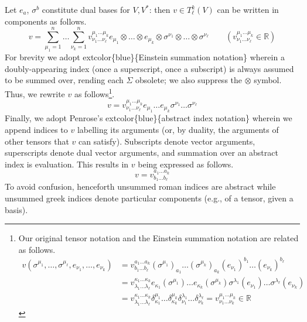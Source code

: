 \documentclass[
]{book}
\begin{document}
Let \(e_a\), \(\sigma^b\) constitute dual bases for \(V, V^*\): then \(v \in T^k_\ell(V)\) can be written in components as follows.
\begin{equation} 
    v = \sum_{\mu_1 = 1}^n \dots \sum_{\nu_k = 1}^n v^{\mu_1\dots \mu_k}_{\nu_1\dots \nu_\ell} e_{\mu_1} \otimes \dots \otimes e_{\mu_k} \otimes \sigma^{\nu_1} \otimes \dots \otimes \sigma^{\nu_\ell} \qquad (v^{\mu_1\dots \mu_k}_{\nu_1\dots \nu_\ell} \in \mathbb{R}) 
\end{equation}
For brevity we adopt extcolor\{blue\}\{Einstein summation notation\} wherein a doubly-appearing index (once a superscript, once a subscript) is always assumed to be summed over, rending each \(\Sigma\) obsolete; we also suppress the \(\otimes\) symbol. Thus, we rewrite \(v\) as follows\footnote{Our original tensor notation and the Einstein summation notation are related as follows.
  \begin{align*}
  v(\sigma^{\mu_1}, \dots, \sigma^{\mu_\ell}, e_{\nu_1}, \dots, e_{\nu_k}) 
  &= v_{b_1\dots b_\ell}^{a_1\dots a_k}(\sigma^{\mu_1})_{a_1}\dots(\sigma^{\mu_k})_{a_k} (e_{\nu_1})^{b_1} \dots (e_{\nu_k})^{b_\ell}\\
  &= v_{\lambda_1\dots \lambda_\ell}^{\kappa_1\dots \kappa_k} e_{\kappa_1}(\sigma^{\mu_1}) \dots e_{\kappa_k}(\sigma^{\mu_k}) \sigma^{\lambda_1}(e_{\nu_1}) \dots \sigma^{\lambda_\ell}(e_{\nu_k})\\
  &= v_{\lambda_1\dots \lambda_\ell}^{\kappa_1\dots \kappa_k} \delta_{\kappa_1}^{\mu_1} \dots \delta_{\kappa_k}^{\mu_k}\delta^{\lambda_1}_{\nu_1} \dots \delta^{\lambda_\ell}_{\nu_k}
  = v_{\nu_1\dots \nu_k}^{\mu_1\dots \mu_k} \in \mathbb{R}
  \end{align*}}.
\begin{equation} 
    v = v_{\nu_1\dots \nu_\ell}^{\mu_1\dots \mu_k} e_{\mu_1} \dots e_{\mu_k} \sigma^{\nu_1} \dots \sigma^{\nu_\ell}
\end{equation}
Finally, we adopt Penrose's extcolor\{blue\}\{abstract index notation\} wherein we append indices to \(v\) labelling its arguments (or, by duality, the arguments of other tensors that \(v\) can satisfy). Subscripts denote vector arguments, superscripts denote dual vector arguments, and summation over an abstract index is evaluation. This results in \(v\) being expressed as follows.
\begin{equation} 
    v = v_{b_1\dots b_\ell}^{a_1\dots a_k} 
\end{equation}
To avoid confusion, henceforth unsummed roman indices are abstract while unsummed greek indices denote particular components (e.g., of a tensor, given a basis).
\end{document}
